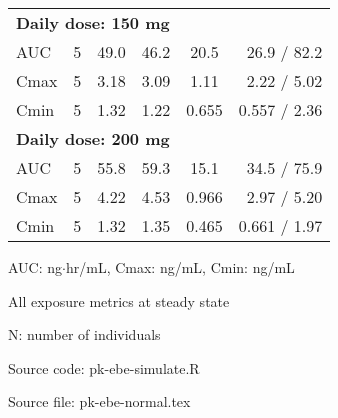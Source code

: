 \begin{threeparttable}
\begin{tabular}[h]{lccccr}
\hline \multicolumn{6}{l}{\textbf{Daily dose: 150 mg}}\\%
AUC & 5 & 49.0 & 46.2 & 20.5 & 26.9 / 82.2 \\
Cmax & 5 & 3.18 & 3.09 & 1.11 & 2.22 / 5.02 \\
Cmin & 5 & 1.32 & 1.22 & 0.655 & 0.557 / 2.36 \\
\hline \multicolumn{6}{l}{\textbf{Daily dose: 200 mg}}\\%
AUC & 5 & 55.8 & 59.3 & 15.1 & 34.5 / 75.9 \\
Cmax & 5 & 4.22 & 4.53 & 0.966 & 2.97 / 5.20 \\
Cmin & 5 & 1.32 & 1.35 & 0.465 & 0.661 / 1.97 \\
\hline
\end{tabular}
\begin{tablenotes}[flushleft]
\item AUC: ng$\cdot$hr/mL, Cmax: ng/mL, Cmin: ng/mL
\item All exposure metrics at steady state
\item N: number of individuals
\item Source code: pk-ebe-simulate.R
\item Source file: pk-ebe-normal.tex
\end{tablenotes}
\end{threeparttable}
